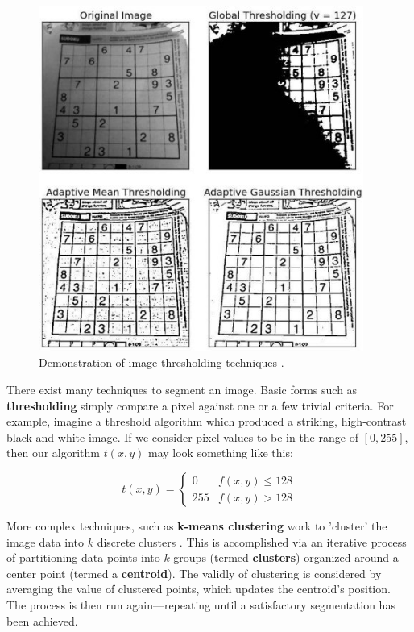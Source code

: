 \documentclass{report}
\newcommand{\tech}[1]{\textbf{#1}}
\begin{document}
\begin{figure}
    \centering
    \includegraphics[width=0.95\textwidth]{thresh.jpg}
    \caption{Demonstration of image thresholding techniques \cite{thresh}.}
    \label{fig:thresh}
\end{figure}

There exist many techniques to segment an image. Basic forms such as \tech{thresholding} simply compare a pixel against one or a few trivial criteria. For example, imagine a threshold algorithm which produced a striking, high-contrast black-and-white image. If we consider pixel values to be in the range of $[0, 255]$, then our algorithm $t(x,y)$ may look something like this:

$$t(x,y) = \begin{cases} 0 & f(x,y) \leq 128 \\ 255 & f(x,y) > 128 \end{cases}$$

More complex techniques, such as \tech{k-means clustering} work to 'cluster' the image data into $k$ discrete clusters \cite{kmeans}. This is accomplished via an iterative process of partitioning data points into $k$ groups (termed \tech{clusters}) organized around a center point (termed a \tech{centroid}). The validly of clustering is considered by averaging the value of clustered points, which updates the centroid's position. The process is then run again---repeating until a satisfactory segmentation has been achieved.
\end{document}
